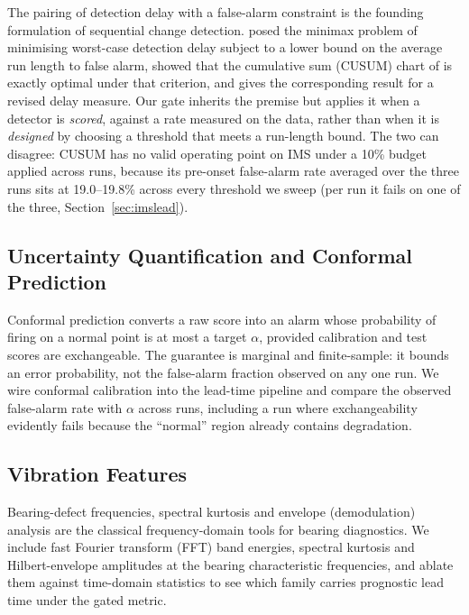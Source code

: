 \documentclass[IJPHM, 2026, 0]{PHMSociety}
\begin{document}
The pairing of detection delay with a false-alarm constraint is the founding formulation of sequential change detection.  posed the minimax problem of minimising worst-case detection delay subject to a lower bound on the average run length to false alarm,  showed that the cumulative sum (CUSUM) chart of  is exactly optimal under that criterion, and  gives the corresponding result for a revised delay measure. Our gate inherits the premise but applies it when a detector is \emph{scored}, against a rate measured on the data, rather than when it is \emph{designed} by choosing a threshold that meets a run-length bound. The two can disagree: CUSUM has no valid operating point on IMS under a 10\% budget applied across runs, because its pre-onset false-alarm rate averaged over the three runs sits at 19.0--19.8\% across every threshold we sweep (per run it fails on one of the three, Section~\ref{sec:imslead}).

\subsection{Uncertainty Quantification and Conformal Prediction}
Conformal prediction \cite{vovk2005algorithmic,laxhammar2014online} converts a raw score into an alarm whose probability of firing on a normal point is at most a target $\alpha$, provided calibration and test scores are exchangeable. The guarantee is marginal and finite-sample: it bounds an error probability, not the false-alarm fraction observed on any one run. We wire conformal calibration into the lead-time pipeline and compare the observed false-alarm rate with $\alpha$ across runs, including a run where exchangeability evidently fails because the ``normal'' region already contains degradation.

\subsection{Vibration Features}
Bearing-defect frequencies, spectral kurtosis \cite{antoni2006spectral} and envelope (demodulation) analysis \cite{randall2011rolling} are the classical frequency-domain tools for bearing diagnostics. We include fast Fourier transform (FFT) band energies, spectral kurtosis and Hilbert-envelope amplitudes at the bearing characteristic frequencies, and ablate them against time-domain statistics to see which family carries prognostic lead time under the gated metric.
\end{document}
